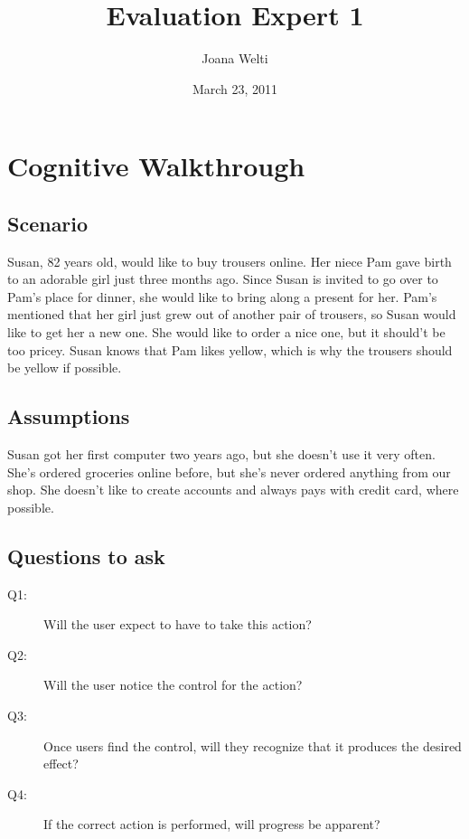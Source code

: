 \documentclass[fontsize=12pt,paper=a4]{scrartcl}
\begin{document}
\title{Evaluation Expert 1}
\date{March 23, 2011}
\author{Joana Welti}
\maketitle

\section{Cognitive Walkthrough}

\subsection{Scenario}
Susan, 82 years old, would like to buy trousers online. Her niece Pam gave birth to an adorable girl just three months ago. Since Susan is invited to go over to Pam's place for dinner, she would like to bring along a present for her. Pam's mentioned that her girl just grew out of another pair of trousers, so Susan would like to get her a new one. She would like to order a nice one, but it should't be too pricey. Susan knows that Pam likes yellow, which is why the trousers should be yellow if possible. 

\subsection{Assumptions}
Susan got her first computer two years ago, but she doesn't use it very often. She's ordered groceries online before, but she's never ordered anything from our shop.
She doesn't like to create accounts and always pays with credit card, where possible.

\subsection{Questions to ask}
\begin{description}
\item[Q1:] Will the user expect to have to take this action?
\item[Q2:] Will the user notice the control for the action?
\item[Q3:] Once users find the control, will they recognize that it produces the desired effect?
\item[Q4:] If the correct action is performed, will progress be apparent?
\end{description}
 
\end{document}
